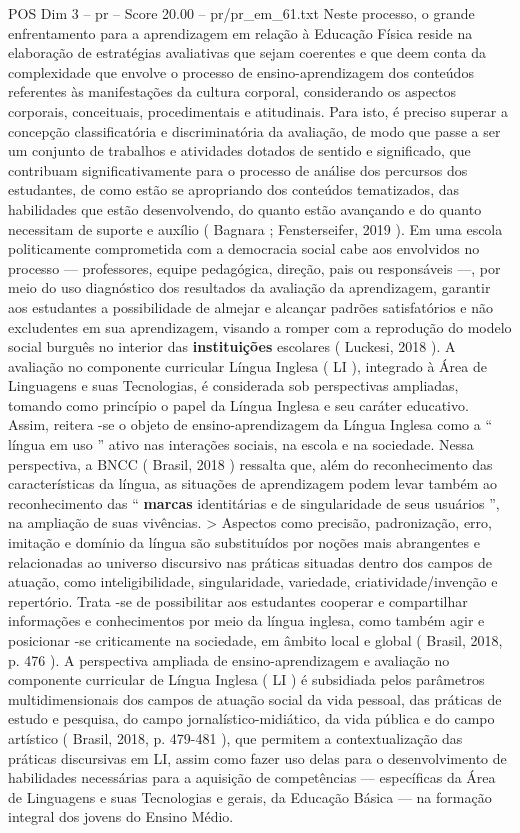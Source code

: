 \begin{textsample}{POS Dim 3 – pr – Score 20.00 – pr/pr\_em\_61.txt}
Neste processo, o grande enfrentamento para a aprendizagem em relação à Educação Física reside na elaboração de estratégias avaliativas que sejam coerentes e que deem conta da complexidade que envolve o processo de ensino-aprendizagem dos conteúdos referentes às manifestações da cultura corporal, considerando os aspectos corporais, conceituais, procedimentais e atitudinais.
Para isto, é preciso superar a concepção classificatória e discriminatória da avaliação, de modo que passe a ser um conjunto de trabalhos e atividades dotados de sentido e significado, que contribuam significativamente para o processo de análise dos percursos dos estudantes, de como estão se apropriando dos conteúdos tematizados, das habilidades que estão desenvolvendo, do quanto estão avançando e do quanto necessitam de suporte e auxílio ( Bagnara ; Fensterseifer, 2019 ).
Em uma escola politicamente comprometida com a democracia social cabe aos envolvidos no processo — professores, equipe pedagógica, direção, pais ou responsáveis —, por meio do uso diagnóstico dos resultados da avaliação da aprendizagem, garantir aos estudantes a possibilidade de almejar e alcançar padrões satisfatórios e não excludentes em sua aprendizagem, visando a romper com a reprodução do modelo social burguês no interior das \textbf{instituições} escolares ( Luckesi, 2018 ).
A avaliação no componente curricular Língua Inglesa ( LI ), integrado à Área de Linguagens e suas Tecnologias, é considerada sob perspectivas ampliadas, tomando como princípio o papel da Língua Inglesa e seu caráter educativo.
Assim, reitera -se o objeto de ensino-aprendizagem da Língua Inglesa como a “ língua em uso ” ativo nas interações sociais, na escola e na sociedade.
Nessa perspectiva, a BNCC ( Brasil, 2018 ) ressalta que, além do reconhecimento das características da língua, as situações de aprendizagem podem levar também ao reconhecimento das “ \textbf{marcas} identitárias e de singularidade de seus usuários ”, na ampliação de suas vivências. > Aspectos como precisão, padronização, erro, imitação e domínio da língua são substituídos por noções mais abrangentes e relacionadas ao universo discursivo nas práticas situadas dentro dos campos de atuação, como inteligibilidade, singularidade, variedade, criatividade/invenção e repertório.
Trata -se de possibilitar aos estudantes cooperar e compartilhar informações e conhecimentos por meio da língua inglesa, como também agir e posicionar -se criticamente na sociedade, em âmbito local e global ( Brasil, 2018, p. 476 ).
A perspectiva ampliada de ensino-aprendizagem e avaliação no componente curricular de Língua Inglesa ( LI ) é subsidiada pelos parâmetros multidimensionais dos campos de atuação social da vida pessoal, das práticas de estudo e pesquisa, do campo jornalístico-midiático, da vida pública e do campo artístico ( Brasil, 2018, p. 479-481 ), que permitem a contextualização das práticas discursivas em LI, assim como fazer uso delas para o desenvolvimento de habilidades necessárias para a aquisição de competências — específicas da Área de Linguagens e suas Tecnologias e gerais, da Educação Básica — na formação integral dos jovens do Ensino Médio.

\end{textsample}
